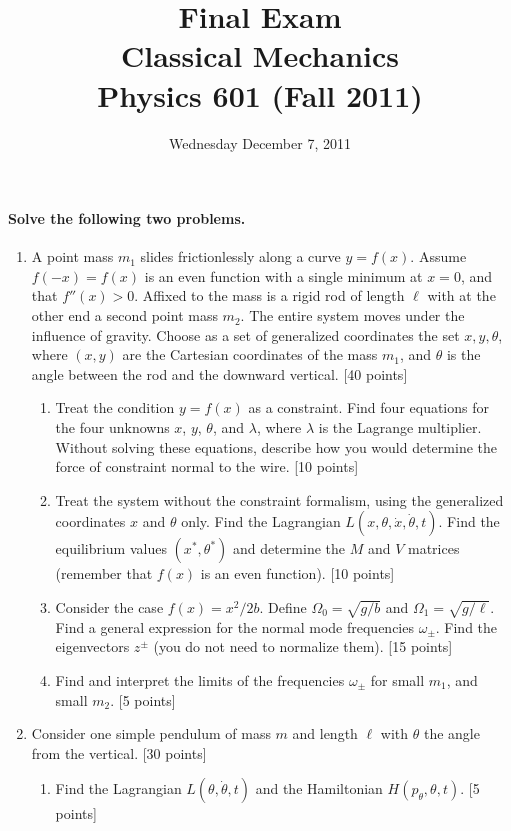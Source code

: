 \documentclass[letterpaper,11pt]{article}
\title{Final Exam \\ Classical Mechanics \\ Physics 601 (Fall 2011)}
\date{Wednesday December 7, 2011}
\begin{document}
\maketitle

\paragraph{Solve the following two problems.}
\begin{enumerate}
 \item A point mass $m_1$ slides frictionlessly along a curve $y = f(x)$.  Assume $f(-x) = f(x)$ is an even function with a single minimum at $x = 0$, and that $f''(x) > 0$.  Affixed to the mass is a rigid rod of length $\ell$ with at the other end a second point mass $m_2$.  The entire system moves under the influence of gravity.  Choose as a set of generalized coordinates the set ${x,y,\theta}$, where $(x,y)$ are the Cartesian coordinates of the mass $m_1$, and $\theta$ is the angle between the rod and the downward vertical. [40 points]
 \begin{enumerate}
  \item Treat the condition $y = f(x)$ as a constraint.  Find four equations for the four unknowns $x$, $y$, $\theta$, and $\lambda$, where $\lambda$ is the Lagrange multiplier.  Without solving these equations, describe how you would determine the force of constraint normal to the wire. [10 points]
  \item Treat the system without the constraint formalism, using the generalized coordinates $x$ and $\theta$ only.  Find the Lagrangian $L(x,\theta,\dot{x},\dot{\theta},t)$.  Find the equilibrium values $(x^*,\theta^*)$ and determine the $M$ and $V$ matrices (remember that $f(x)$ is an even function). [10 points]
  \item Consider the case $f(x) = x^2/2b$.  Define $\Omega_0 = \sqrt{g/b}$ and $\Omega_1 = \sqrt{g/\ell}$.  Find a general expression for the normal mode frequencies $\omega_\pm$.  Find the eigenvectors $z^\pm$ (you do not need to normalize them). [15 points]
  \item Find and interpret the limits of the frequencies $\omega_\pm$ for small $m_1$, and small $m_2$. [5 points]
 \end{enumerate}
 \item \label{prob:pendulum} Consider one simple pendulum of mass $m$ and length $\ell$ with $\theta$ the angle from the vertical. [30 points]
 \begin{enumerate}
  \item Find the Lagrangian $L(\theta,\dot{\theta},t)$ and the Hamiltonian $H(p_\theta,\theta,t)$. [5 points]

\end{enumerate}
\end{enumerate}
\end{document}
